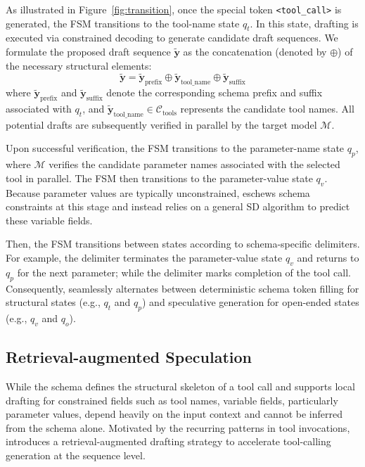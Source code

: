 As illustrated in Figure~\ref{fig:transition}, once the special token \texttt{<tool\_call>} is generated, the FSM transitions to the tool-name state $q_t$. In this state, drafting is executed via constrained decoding to generate candidate draft sequences. We formulate the proposed draft sequence $\tilde{\boldsymbol{y}}$ as the concatenation (denoted by $\oplus$) of the necessary structural elements:
\begin{equation}\label{eq:draft}
    \tilde{\boldsymbol{y}} = \tilde{\boldsymbol{y}}_{\text{prefix}} \oplus \tilde{\boldsymbol{y}}_{\text{tool\_name}} \oplus \tilde{\boldsymbol{y}}_{\text{suffix}}
\end{equation}
where $\tilde{\boldsymbol{y}}_{\text{prefix}}$ and $\tilde{\boldsymbol{y}}_{\text{suffix}}$ denote the corresponding schema prefix and suffix associated with $q_t$, and $\tilde{\boldsymbol{y}}_{\text{tool\_name}} \in \mathcal{C}_{\text{tools}}$ represents the candidate tool names. All potential drafts are subsequently verified in parallel by the target model $\mathcal{M}$.

Upon successful verification, the FSM transitions to the parameter-name state $q_p$, where $\mathcal{M}$ verifies the candidate parameter names associated with the selected tool in parallel. The FSM then transitions to the parameter-value state $q_v$. Because parameter values are typically unconstrained, \method eschews schema constraints at this stage and instead relies on a general SD algorithm to predict these variable fields.

Then, the FSM transitions between states according to schema-specific delimiters. For example, the delimiter  terminates the parameter-value state $q_v$ and returns to $q_p$ for the next parameter; while the delimiter  marks completion of the tool call. Consequently, \method seamlessly alternates between deterministic schema token filling for structural states (e.g., $q_t$ and $q_p$) and speculative generation for open-ended states (e.g., $q_v$ and $q_o$).

\subsection{Retrieval-augmented Speculation}
While the schema defines the structural skeleton of a tool call and supports local drafting for constrained fields such as tool names, variable fields, particularly parameter values, depend heavily on the input context and cannot be inferred from the schema alone. Motivated by the recurring patterns in tool invocations, \method introduces a retrieval-augmented drafting strategy to accelerate tool-calling generation at the sequence level.

